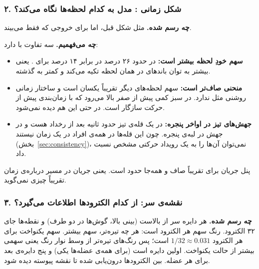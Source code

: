 
\subsubsection*{۲. شکل زمانی : مدل  به کدام لحظه‌ها نگاه می‌کند؟}

\textbf{چه رسم شده.} مثل شکل قبل، اما برای خروجی  که فقط  می‌بیند.

\textbf{چه می‌فهمیم.} سه تفاوت با  دارد:
\begin{itemize}
\item \textbf{سهم خودِ لحظه بیشتر است:} در  حدود ۲۶ درصد در برابر ۱۴ درصد برای . یعنی  بیشتر به توان باندهای  در همان لحظه تکیه می‌کند و کمتر به گذشته.
\item \textbf{منحنی صاف‌تر است:} سهم لحظه‌های دیگر تقریباً یکسان است و ساختار زمانی روشنی مثل  ندارد. در  سبز کمی پیش از صفر بالا می‌رود که با زمان‌بندی  پیش از حرکت سازگار است. در  حتی این هم دیده نمی‌شود.
\item \textbf{جهش‌های تیز در اواخر پنجره:} در  یک قله‌ی تیز حدود  ثانیه بعد از رخداد هست و در  جهش در لبه‌ی پنجره. چون این قله‌ها در همه‌ی افراد در یک زمان نیستند (بخش~\ref{sec:consistency})، نمی‌توان آن‌ها را به یک رویداد حرکتی مشخص نسبت داد.
\end{itemize}
پنل جریان برای  تقریباً صاف و همه‌جا حدود  است. یعنی جریان در مسیر  درباره‌ی زمان تقریباً چیزی نمی‌گوید.


\subsubsection*{۳. نقشه‌ی سر:  از کدام الکترودها اطلاعات می‌گیرد؟}

\textbf{چه رسم شده.} هر دایره سر از بالاست (بینی بالا، گوش‌ها در دو طرف) و نقطه‌ها جای ۳۲ الکترود. رنگ سهم هر الکترود است: هر چه تیره‌تر، سهم بیشتر. سهم یکنواخت برای هر الکترود $1/32\approx0.031$ است؛ پس رنگ‌های تیره‌تر از وسط نوار رنگ یعنی سهمی بیشتر از حالت یکنواخت. اولین دایره  است (برای همه‌ی عضله‌ها یکی) و پنج دایره‌ی بعد  برای هر عضله. بین الکترودها درون‌یابی شده تا نقشه پیوسته دیده شود.

